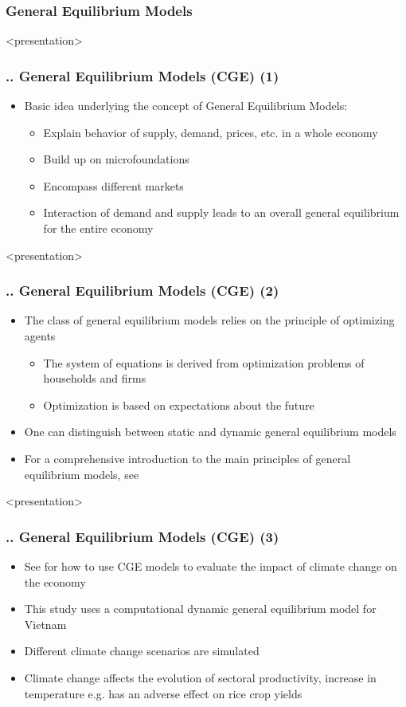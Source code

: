 \documentclass[11pt,aspectratio=169]{beamer}
\begin{document}
\subsubsection{General Equilibrium Models}
\begin{frame}<presentation>
	\frametitle{{\thesection.\thesubsection.\thesubsubsection} General Equilibrium Models (CGE) (1)}
	\begin{itemize}		
		\item Basic idea underlying the concept of General Equilibrium Models:
		\begin{itemize}
			\item Explain behavior of supply, demand, prices, etc. in a whole economy
			\item Build up on microfoundations
			\item Encompass different markets 
			\item Interaction of demand and supply leads to an overall general equilibrium for the entire economy
		\end{itemize}
	\end{itemize}
\end{frame}
\begin{frame}<presentation>
	\frametitle{{\thesection.\thesubsection.\thesubsubsection} General Equilibrium Models (CGE) (2)}
	\begin{itemize}
	
		\item The class of general equilibrium models relies on the principle of optimizing agents
			\begin{itemize}
				\item The system of equations is derived from optimization problems of households and firms
				\item Optimization is based on expectations about the future
			\end{itemize}
	\item One can distinguish between static and dynamic general equilibrium models 
		\item For a comprehensive introduction to the main principles of general equilibrium models, see \cite{wing2004computable}
\end{itemize}
\end{frame}
\begin{frame}<presentation>
	\frametitle{{\thesection.\thesubsection.\thesubsubsection} General Equilibrium Models (CGE) (3)}
	\begin{itemize}
		\item See \cite{arndt2015economic} for how to use CGE models to evaluate the impact of climate change on the economy
		\item This study uses a computational dynamic general equilibrium model for Vietnam
		\item Different climate change scenarios are simulated
		\item Climate change affects the evolution of sectoral productivity, increase in temperature e.g. has an adverse effect on rice crop yields
\end{itemize}
\end{frame}
\end{document}
